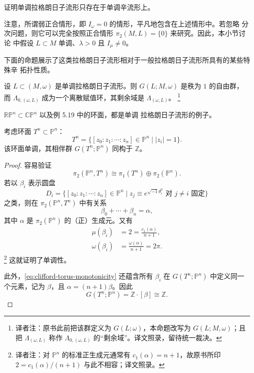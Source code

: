 \begin{exercise}
\label{ex:monotone-lagrangian-ambient}
证明单调拉格朗日子流形只存在于单调辛流形上。
\end{exercise}

注意，所谓弱正合情形，即 $I_\omega=0$ 的情形，平凡地包含在上述情形中。若忽略
分次问题，则它可以完全按照正合情形 $\pi_2(M,L)=\{0\}$ 来研究。因此，本小节讨论
中假设 $L\subset M$ 单调、$\lambda>0$ 且 $I_\mu\neq0$。

下面的命题展示了这类拉格朗日子流形相对于一般拉格朗日子流形所具有的某些特殊辛
拓扑性质。

\begin{proposition}
\label{prop:monotone-lagrangian-group-rank-one}
设 $L\subset(M,\omega)$ 是单调拉格朗日子流形。则 $G(L;M,\omega)$ 是秩为 $1$
的自由\personAbel{}群，而 $\Lambda_{0,(\omega,L)}$ 成为一个离散赋值环，其剩余域是
$\Lambda_{(\omega,L)}$。
\footnote{译者注：原书此前把该群定义为 $G(L;\omega)$，本命题改写为
$G(L;M,\omega)$；且把 $\Lambda_{(\omega,L)}$ 称作
$\Lambda_{0,(\omega,L)}$ 的“剩余域”。译文照录，留待统一裁决。}
\end{proposition}

$\mathbb{RP}^n\subset\mathbb{CP}^n$ 以及例 5.19 中的\personClifford{}环面，都是单调
拉格朗日子流形的例子。

\begin{proposition}
\label{prop:clifford-torus-monotone}
考虑\personClifford{}环面 $T^n\subset\mathbb P^n$：
\[
 T^n=\{[z_0:z_1:\cdots:z_n]\in\mathbb P^n\mid |z_i|=1\}.
\]
该环面单调，其相伴群 $G(T^n;\mathbb P^n)$ 同构于 $\mathbb Z$。
\end{proposition}

\begin{proof}
容易验证
\[
 \pi_2(\mathbb P^n,T^n)\cong\pi_1(T^n)\oplus\pi_2(\mathbb P^n).
\]
若以 $\beta_i$ 表示圆盘
\[
 D_i=\{[z_0:z_1:\cdots:z_n]\in\mathbb P^n
 \mid z_j\equiv e^{\sqrt{-1}\theta_i^0}\text{ 对 }j\neq i\text{ 固定}\}
\]
之类，则在 $\pi_2(\mathbb P^n,T^n)$ 中有关系
\[
 \beta_0+\cdots+\beta_n=\alpha,
\]
其中 $\alpha$ 是 $\pi_2(\mathbb P^n)$ 的（正）生成元。又有
\begin{equation}
\begin{aligned}
 \mu(\beta_i)&=2=\frac{c_1(\alpha)}{n+1},\\
 \omega(\beta_i)&=\frac{\omega(\alpha)}{n+1}=2\pi.
 \end{aligned}
\label{eq:clifford-torus-monotonicity}
\end{equation}
\footnote{译者注：对 $\mathbb P^n$ 的标准正生成元通常有
$c_1(\alpha)=n+1$，故原书所印 $2=c_1(\alpha)/(n+1)$ 与此不相容；译文照录。}
这就证明了单调性。

此外，\eqref{eq:clifford-torus-monotonicity} 还蕴含所有 $\beta_i$ 在
$G(T^n;\mathbb P^n)$ 中定义同一个元素，记为 $\beta$，且
$\alpha=(n+1)\beta$。因此
\[
 G(T^n;\mathbb P^n)=\mathbb Z\cdot[\beta]\cong\mathbb Z.
\]
\end{proof}

